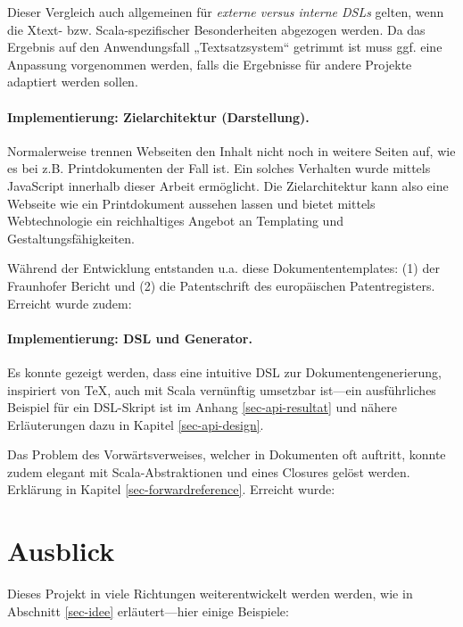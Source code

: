 Dieser Vergleich auch allgemeinen für \emph{externe versus
interne DSLs} gelten, wenn die Xtext- bzw. Scala-spezifischer Besonderheiten
abgezogen werden. Da das Ergebnis
auf den Anwendungsfall „Textsatzsystem“ getrimmt ist muss ggf. eine Anpassung
vorgenommen werden, falls die Ergebnisse für andere Projekte adaptiert werden sollen.

\paragraph{Implementierung: Zielarchitektur (Darstellung).}
Normalerweise trennen Webseiten den Inhalt nicht noch in weitere Seiten auf,
wie es bei z.B. Printdokumenten der Fall ist.
Ein solches Verhalten wurde mittels JavaScript innerhalb dieser Arbeit
ermöglicht.
Die Zielarchitektur kann also eine Webseite wie ein Printdokument aussehen
lassen und bietet mittels Webtechnologie ein reichhaltiges Angebot an
Templating und Gestaltungsfähigkeiten.

Während der Entwicklung entstanden u.a. diese Dokumententemplates: (1)
der Fraunhofer Bericht und (2) die Patentschrift des europäischen
Patentregisters. Erreicht wurde zudem:

\erreichtZielarchi

\paragraph{Implementierung: DSL und Generator.} Es konnte gezeigt werden,
dass eine intuitive DSL zur Dokumentengenerierung, inspiriert von \TeX,
auch mit Scala vernünftig umsetzbar ist---ein ausführliches Beispiel
für ein DSL-Skript ist im Anhang \ref{sec-api-resultat} und
nähere Erläuterungen dazu in Kapitel \ref{sec-api-design}.

Das Problem des Vorwärtsverweises, welcher in Dokumenten oft auftritt,
konnte zudem elegant mit Scala-Abstraktionen und eines Closures gelöst werden.
Erklärung in Kapitel \ref{sec-forwardreference}. Erreicht wurde:

\erreichtDSL

\section{Ausblick}

Dieses Projekt in viele Richtungen weiterentwickelt werden werden,
wie in Abschnitt \ref{sec-idee} erläutert---hier einige Beispiele:

